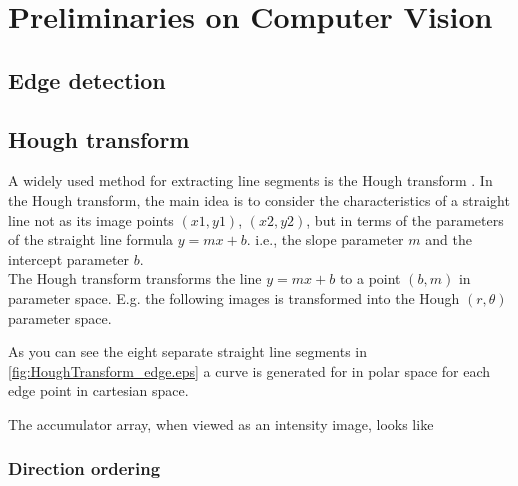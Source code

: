 \section{Preliminaries on Computer Vision}

\subsection{Edge detection}
\label{sec:edge}

\subsection{Hough transform}
	A widely used method for extracting line segments is the Hough transform
	\cite{Hough}.
	In the Hough transform, the main idea is to consider the characteristics of a
	straight line not as its image points $(x1, y1)$, $(x2, y2)$, but in
	terms of the parameters of the straight line formula $y = mx + b$. i.e., the
	slope parameter $m$ and the intercept parameter $b$.\\
	The Hough transform transforms the line $y = mx + b$ 
	to a point $(b,m)$ in parameter space.
	E.g. the following images is transformed into the Hough $(r,\theta)$ parameter space.
	
	 
	 As you can see the eight separate straight line segments in \ref{fig:HoughTransform_edge.eps} 
	 a curve is generated for 
	 in polar space for each edge point in cartesian space. 
	 
	 The accumulator array, when viewed as an intensity image, looks like 

	





\subsubsection{Direction ordering}



